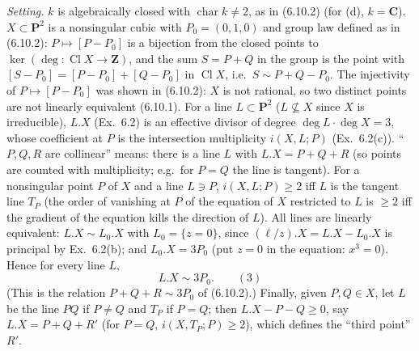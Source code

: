 \documentclass[11pt]{article}
\begin{document}
\pf
\emph{Setting.} $k$ is algebraically closed with $\operatorname{char}k\ne2$, as in (6.10.2) (for (d), $k=\mathbf C$). $X\subset\mathbf P^2$ is a nonsingular cubic with $P_0=(0,1,0)$ and group law defined as in (6.10.2): $P\mapsto[P-P_0]$ is a bijection from the closed points to $\ker(\deg:\operatorname{Cl}X\to\mathbf Z)$, and the sum $S=P+Q$ in the group is the point with $[S-P_0]=[P-P_0]+[Q-P_0]$ in $\operatorname{Cl}X$, i.e.\ $S\sim P+Q-P_0$. The injectivity of $P\mapsto[P-P_0]$ was shown in (6.10.2): $X$ is not rational, so two distinct points are not linearly equivalent (6.10.1). For a line $L\subset\mathbf P^2$ ($L\not\subseteq X$ since $X$ is irreducible), $L.X$ (Ex.~6.2) is an effective divisor of degree $\deg L\cdot\deg X=3$, whose coefficient at $P$ is the intersection multiplicity $i(X,L;P)$ (Ex.~6.2(c)). ``$P,Q,R$ are collinear'' means: there is a line $L$ with $L.X=P+Q+R$ (so points are counted with multiplicity; e.g.\ for $P=Q$ the line is tangent). For a nonsingular point $P$ of $X$ and a line $L\ni P$, $i(X,L;P)\ge2$ iff $L$ is the tangent line $T_P$ (the order of vanishing at $P$ of the equation of $X$ restricted to $L$ is $\ge2$ iff the gradient of the equation kills the direction of $L$). All lines are linearly equivalent: $L.X\sim L_0.X$ with $L_0=\{z=0\}$, since $(\ell/z).X=L.X-L_0.X$ is principal by Ex.~6.2(b); and $L_0.X=3P_0$ (put $z=0$ in the equation: $x^3=0$). Hence for every line $L$,
\[
L.X\sim3P_0.\qquad(3)
\]
(This is the relation $P+Q+R\sim3P_0$ of (6.10.2).) Finally, given $P,Q\in X$, let $L$ be the line $PQ$ if $P\ne Q$ and $T_P$ if $P=Q$; then $L.X-P-Q\ge0$, say $L.X=P+Q+R'$ (for $P=Q$, $i(X,T_P;P)\ge2$), which defines the ``third point'' $R'$.
\end{document}
